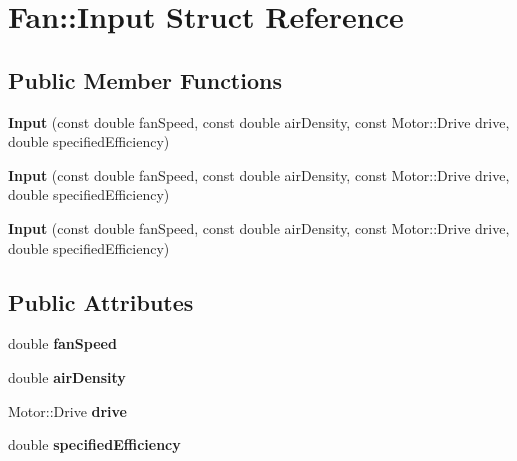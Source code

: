 \hypertarget{struct_fan_1_1_input}{}\section{Fan\+:\+:Input Struct Reference}
\label{struct_fan_1_1_input}
\subsection*{Public Member Functions}
\begin{DoxyCompactItemize}
\item 
\mbox{\label{struct_fan_1_1_input_a5f024f50baf2dda0546c3328168c290e}} 
{\bfseries Input} (const double fan\+Speed, const double air\+Density, const Motor\+::\+Drive drive, double specified\+Efficiency)
\item 
\mbox{\label{struct_fan_1_1_input_a5f024f50baf2dda0546c3328168c290e}} 
{\bfseries Input} (const double fan\+Speed, const double air\+Density, const Motor\+::\+Drive drive, double specified\+Efficiency)
\item 
\mbox{\label{struct_fan_1_1_input_a5f024f50baf2dda0546c3328168c290e}} 
{\bfseries Input} (const double fan\+Speed, const double air\+Density, const Motor\+::\+Drive drive, double specified\+Efficiency)
\end{DoxyCompactItemize}
\subsection*{Public Attributes}
\begin{DoxyCompactItemize}
\item 
\mbox{\label{struct_fan_1_1_input_aa31350b310c1b98f107d58ba365378d8}} 
double {\bfseries fan\+Speed}
\item 
\mbox{\label{struct_fan_1_1_input_a2a62a82803563bbc967bdba928cb60fc}} 
double {\bfseries air\+Density}
\item 
\mbox{\label{struct_fan_1_1_input_a16334966d72198d8b3ede5d222480fc0}} 
Motor\+::\+Drive {\bfseries drive}
\item 
\mbox{\label{struct_fan_1_1_input_a378d6eb10478d4ce7dff657b3e526a3a}} 
double {\bfseries specified\+Efficiency}
\end{DoxyCompactItemize}


